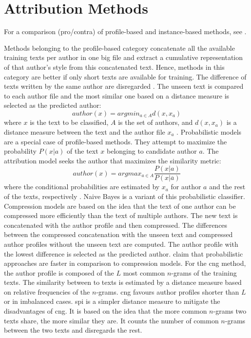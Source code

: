 \section{Attribution Methods}
\label{sec:attribution_methods}

For a comparison (pro/contra) of profile-based and instance-based methods, see \citet{stamatatos_survey_2009}.

Methods belonging to the profile-based category concatenate all the available training texts per author in one big file 
and extract a cumulative representation of that author's style from this concatenated text.
Hence, methods in this category are better if only short texts are available for training.
The difference of texts written by the same author are disregarded \cite{stamatatos_survey_2009}.
The unseen text is compared to each author file and the most similar one based on a distance measure is selected as the predicted author:
$$ author(x) = argmin_{a \in A} d(x, x_a) $$
where $x$ is the text to be classified, $A$ is the set of authors, and $d(x, x_a)$ is a distance measure 
between the text and the author file $x_a$ \cite{stamatatos_survey_2009}.
Probabilistic models are a special case of profile-based methods.
They attempt to maximize the probability $P(x|a)$ of the text $x$ belonging to candidate author $a$.
The attribution model seeks the author that maximizes the similarity metric: 
$$ author(x) = argmax_{a \in A} \frac{P(x|a)}{P(x|\overline{a})} $$
where the conditional probabilities are estimated by $x_a$ for author $a$ and the rest of the texts, respectively \cite{stamatatos_survey_2009}.
Naive Bayes is a variant of this probabilistic  classifier.
Compression models are based on the idea that the text of one author can be compressed more efficiently than the text of multiple authors.
The new text is concatenated with the author profile and then compressed.
The differences between the compressed concatenation with the unseen text and compressed author profiles without the unseen text are computed.
The author profile with the lowest difference is selected as the predicted author.
\citet{stamatatos_survey_2009} claim that probabilistic approaches are faster in comparison to compression models.
For the \ac{cng} method, the author profile is composed of the $L$ most common $n$-grams of the training texts.
The similarity between to texts is estimated by a distance measure based on relative frequencies of the $n$-grams.
\ac{cng} favours author profiles shorter than $L$ or in imbalanced cases.
\ac{spi} is a simpler distance measure to mitigate the disadvantages of \ac{cng}.
It is based on the idea that the more common $n$-grams two texts share, the more similar they are.
It counts the number of common $n$-grams between the two texts and disregards the rest.

